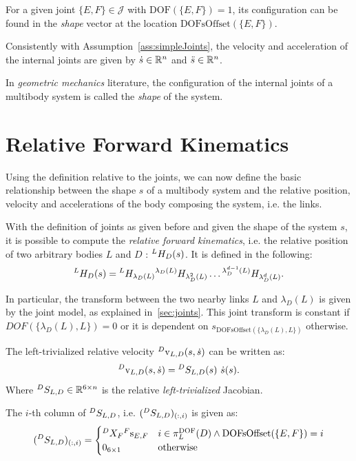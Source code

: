 For a given joint $\{E,F\} \in \mathcal{J}$ with $\text{DOF}(\{E,F\} ) = 1$, its configuration can be found in the \emph{shape} vector at the location $\text{DOFsOffset}(\{E,F\})$.
 
Consistently with Assumption~\ref{ass:simpleJoints}, the velocity and acceleration of the internal joints are given by $\dot{s} \in \mathbb{R}^n$ and  $\ddot{s} \in \mathbb{R}^n$.

\begin{remark}
In \emph{geometric mechanics} literature, the configuration of the internal joints of a multibody system is called the \emph{shape} of the system.
\end{remark}
\section{Relative Forward Kinematics}
Using the definition relative to the joints, we can now define the basic relationship between the shape $s$ of a multibody system and the relative position, velocity and accelerations of the body composing the system, i.e. the links. 

With the definition of joints as given before and given the shape of the system $s$, it is possible to compute the \emph{relative forward kinematics}, i.e. the relative position of two arbitrary bodies $L$ and $D$ : $\hspace{0em}^L H_D(s)$.
It is defined in the following:
\begin{equation}
\label{eq:relativeFwdKin}
    \hspace{0em}^L H_D(s) = \hspace{0em}^L H_{\lambda_D(L)} \hspace{0em}^{\lambda_D(L)} H_{\lambda_D^{2}(L)} \dots \hspace{0em}^{\lambda_D^{d-1}(L)} H_{\lambda_D^{d}(L)} .
\end{equation}

In particular, the transform between the two nearby links $L$ and $\lambda_D(L)$ is given by the joint model, as explained in~\ref{sec:joints}. This joint transform is constant if $DOF( \{ \lambda_{D}(L),L\}) = 0$ or it is dependent on  $s_{\text{DOFsOffset}(\{\lambda_D(L),L\})}$ otherwise. 

\begin{proposition}
The left-trivialized relative velocity $\hspace{0em}^D {\rm v}_{L,D}(s,\dot{s})$ can be  written as:
\begin{equation}
\label{eq:relJacobDef}
    \hspace{0em}^D {\rm v}_{L,D}(s,\dot{s}) = \hspace{0em}^D S_{L,D}(s)~\dot{s}(s) .
\end{equation}
Where $\hspace{0em}^D S_{L,D} \in \mathbb{R}^{6 \times n}$ is the relative \emph{left-trivialized} Jacobian.

The $i$-th column of $\hspace{0em}^D S_{L,D}$, i.e. $(\hspace{0em}^D S_{L,D})_{(:,i)}$ is given as:
\begin{equation}
    \label{eq:relativeJacobianDefinition}
    (\hspace{0em}^D S_{L,D})_{(:,i)} = 
    \begin{cases} 
      \hspace{0em}^D X_F \hspace{0em}^F 
      \mathrm{s}_{E,F} & i \in  \pi^{\text{DOF}}_L(D) \land \text{DOFsOffset}(\{E,F\}) = i \\
        0_{6 \times 1} & \text{otherwise} 
   \end{cases}
\end{equation}
\end{proposition}


